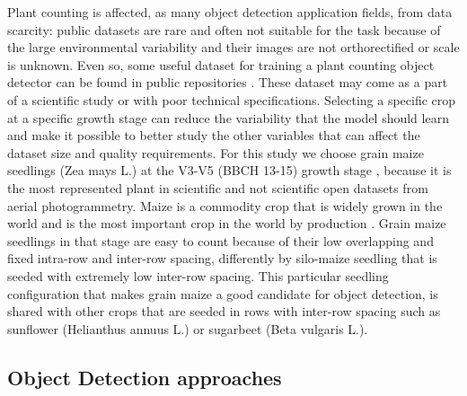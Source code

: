 \documentclass[12pt,a4paper,oneside]{report}
\begin{document}
Plant counting is affected, as many object detection application fields, from data scarcity: public datasets
are rare and often not suitable for the task because of the large environmental
variability and their images are not orthorectified or scale is unknown. 
Even so, some useful dataset for training a plant counting object detector can be found in public repositories \cite{heiderSurveyDatasetsComputer2025}.
These dataset may come as a part of a scientific study or with poor technical specifications. 
Selecting a specific crop at a specific growth stage can reduce the variability that 
the model should learn and make it possible to better study the other variables
that can affect the dataset size and quality requirements. 
For this study we choose grain maize seedlings
(Zea mays L.) at the V3-V5 (BBCH 13-15) growth stage \cite{meierBBCHSystemCoding2009},
because it is the most represented plant in scientific \cite{davidPlantDetectionCounting2021,liuIntegrateNetDeepLearning2022}
and not scientific \cite{Maize_seedingDatasetOverview,MaizeseedlingdetectionDatasetOverview}
open datasets from aerial photogrammetry. 
Maize is a commodity crop that is widely grown in the world and is the most important
crop in the world by production \cite{fao2024}. Grain maize seedlings in that stage are easy to
count because of their low overlapping and fixed intra-row and inter-row spacing, 
differently by silo-maize seedling that is seeded with extremely low inter-row spacing.
This particular seedling configuration that makes grain maize a good candidate for object detection,
is shared with other crops that are seeded in rows with inter-row spacing such as sunflower (Helianthus annuus L.)
or sugarbeet (Beta vulgaris L.). 

\subsection{Object Detection approaches}
\label{subsec:object_detection_approaches}
\end{document}
